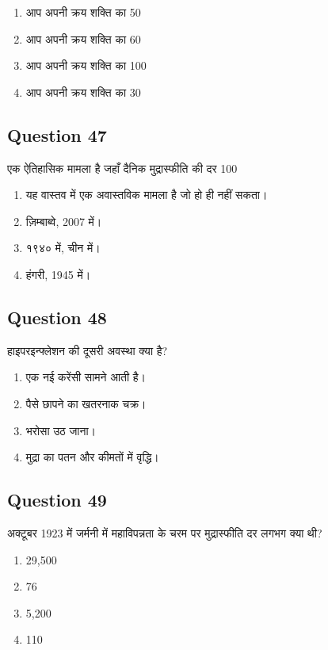 \documentclass[12pt,a4paper]{article}
\begin{document}
\begin{enumerate}[label=\Alph*., leftmargin=*]
\item आप अपनी क्रय शक्ति का 50%
\item आप अपनी क्रय शक्ति का 60%
\item आप अपनी क्रय शक्ति का 100%
\item आप अपनी क्रय शक्ति का 30%
\end{enumerate}

\bigskip


\subsection*{Question 47}
एक ऐतिहासिक मामला है जहाँ दैनिक मुद्रास्फीति की दर 100%

\begin{enumerate}[label=\Alph*., leftmargin=*]
\item यह वास्तव में एक अवास्तविक मामला है जो हो ही नहीं सकता।
\item ज़िम्बाब्वे, 2007 में।
\item १९४० में, चीन में।
\item हंगरी, 1945 में।
\end{enumerate}

\bigskip


\subsection*{Question 48}
हाइपरइन्फ्लेशन की दूसरी अवस्था क्या है?

\begin{enumerate}[label=\Alph*., leftmargin=*]
\item एक नई करेंसी सामने आती है।
\item पैसे छापने का खतरनाक चक्र।
\item भरोसा उठ जाना।
\item मुद्रा का पतन और कीमतों में वृद्धि।
\end{enumerate}

\bigskip


\subsection*{Question 49}
अक्टूबर 1923 में जर्मनी में महाविपन्नता के चरम पर मुद्रास्फीति दर लगभग क्या थी?

\begin{enumerate}[label=\Alph*., leftmargin=*]
\item 29,500%
\item 76%
\item 5,200%
\item 110%
\end{enumerate}
\end{document}
